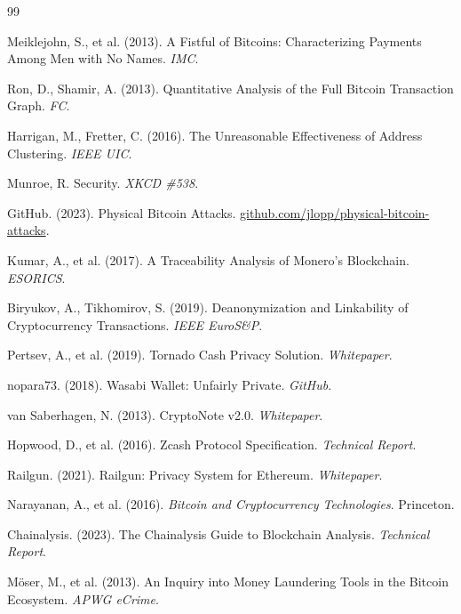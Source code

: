 \documentclass[11pt]{article}
\theoremstyle{definition}
\theoremstyle{plain}
\theoremstyle{remark}
\begin{document}
\begin{thebibliography}{99}

Meiklejohn, S., et al. (2013). A Fistful of Bitcoins: Characterizing Payments Among Men with No Names. \textit{IMC}.

Ron, D., Shamir, A. (2013). Quantitative Analysis of the Full Bitcoin Transaction Graph. \textit{FC}.

Harrigan, M., Fretter, C. (2016). The Unreasonable Effectiveness of Address Clustering. \textit{IEEE UIC}.

Munroe, R. Security. \textit{XKCD \#538}.

GitHub. (2023). Physical Bitcoin Attacks. \url{github.com/jlopp/physical-bitcoin-attacks}.

Kumar, A., et al. (2017). A Traceability Analysis of Monero's Blockchain. \textit{ESORICS}.

Biryukov, A., Tikhomirov, S. (2019). Deanonymization and Linkability of Cryptocurrency Transactions. \textit{IEEE EuroS\&P}.

Pertsev, A., et al. (2019). Tornado Cash Privacy Solution. \textit{Whitepaper}.

nopara73. (2018). Wasabi Wallet: Unfairly Private. \textit{GitHub}.

van Saberhagen, N. (2013). CryptoNote v2.0. \textit{Whitepaper}.

Hopwood, D., et al. (2016). Zcash Protocol Specification. \textit{Technical Report}.

Railgun. (2021). Railgun: Privacy System for Ethereum. \textit{Whitepaper}.

Narayanan, A., et al. (2016). \textit{Bitcoin and Cryptocurrency Technologies}. Princeton.

Chainalysis. (2023). The Chainalysis Guide to Blockchain Analysis. \textit{Technical Report}.

M\"{o}ser, M., et al. (2013). An Inquiry into Money Laundering Tools in the Bitcoin Ecosystem. \textit{APWG eCrime}.


\end{thebibliography}
\end{document}
